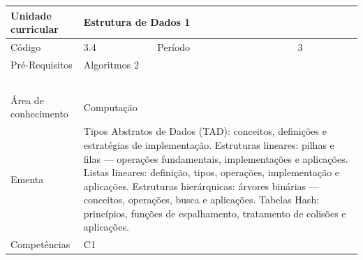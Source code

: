 \clearpage
\newpage

\begin{quadro}[ht!]
  \centering\scriptsize
\caption{Unidade Curricular Estrutura de Dados 1}

\begin{tabular}{|p{2.5cm}|p{2.5cm}|p{2.5cm}|p{2.5cm}|p{2.5cm}|}\hline

  Unidade curricular & \multicolumn{4}{p{10cm}|}{ Estrutura de Dados 1 }\\\hline
  Código & 3.4 & Período & \multicolumn{2}{p{5cm}|}{ 3 }\\\hline
  Pré-Requisitos & \multicolumn{4}{p{10cm}|}{ Algoritmos 2 } \\\hline
  \cellcolor{blue1}{ CH PRESENCIAL } &
    \cellcolor{blue1}{CH EAD Síncrona} &
    \cellcolor{blue1}{CH EAD Síncrona Mediada} &
    \cellcolor{blue1}{CH EAD Assíncrona} &
    \cellcolor{blue1}{CH APCC} \\\hline
  \cellcolor{blue1}{ 60 } &
    \cellcolor{blue1}{ 0 } &
    \cellcolor{blue1}{ 0 } &
    \cellcolor{blue1}{ 0 } &
    \cellcolor{blue1}{0} \\\hline
  \cellcolor{blue1}{ CH Teórica } &
    \cellcolor{blue1}{CH Prática} &
    \cellcolor{blue1}{CH Humanidades} &
    \cellcolor{blue1}{CH Extensão} &
    \cellcolor{blue1}{CH EAD TOTAL} \\\hline
  \cellcolor{blue1}{ 30 } &
    \cellcolor{blue1}{ 30 } &
    \cellcolor{blue1}{ 0 } &
    \cellcolor{blue1}{ 0 } &
    \cellcolor{blue1}{ 0 } \\\hline
  \cellcolor{blue1}{CARGA-HORÁRIA TOTAL} & \multicolumn{4}{p{10cm}|}{ \cellcolor{blue1}{ 60 } } \\\hline
  Área de conhecimento & \multicolumn{4}{p{10cm}|}{ Computação } \\\hline
  Ementa & \multicolumn{4}{p{10cm}|}{ Tipos Abstratos de Dados (TAD): conceitos, definições e estratégias de implementação. Estruturas lineares: pilhas e filas — operações fundamentais, implementações e aplicações. Listas lineares: definição, tipos, operações, implementação e aplicações. Estruturas hierárquicas: árvores binárias — conceitos, operações, busca e aplicações. Tabelas Hash: princípios, funções de espalhamento, tratamento de colisões e aplicações. } \\\hline
  Competências & \multicolumn{4}{p{10cm}|}{ C1 } \\\hline


  
	\end{tabular}

\end{quadro}


